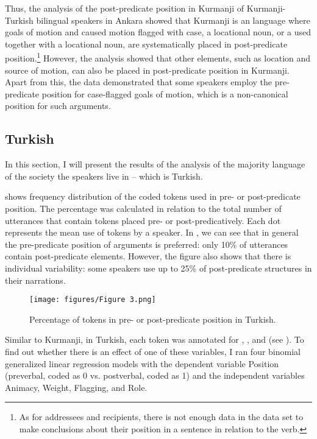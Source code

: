 \documentclass[output=paper,colorlinks,citecolor=brown]{langscibook}
\begin{document}
Thus, the analysis of the post-predicate position in Kurmanji of Kurmanji-Turkish bilingual speakers in Ankara showed that Kurmanji is an  language where goals of motion and caused motion flagged with case, a locational noun, or a  used together with a locational noun, are systematically placed in post-predicate position.\footnote{As for addressees and recipients, there is not enough data in the data set to make conclusions about their position in a sentence in relation to the verb.} However, the analysis showed that other elements, such as location and source of motion, can also be placed in post-predicate position in Kurmanji. Apart from this, the data demonstrated that some speakers employ the pre-predicate position for case-flagged goals of motion, which is a non-canonical position for such arguments. 

\subsection{Turkish}\label{Bilingual:ss:6.2}

In this section, I will present the results of the analysis of the majority language of the society the speakers live in – which is Turkish. 

 shows frequency distribution of the coded tokens used in pre- or post-predicate position. The percentage was calculated in relation to the total number of utterances that contain tokens placed pre- or post-predicatively. Each dot represents the mean use of tokens by a speaker. In , we can see that in general the pre-predicate position of arguments is preferred: only 10\% of utterances contain post-predicate elements. However, the figure also shows that there is individual variability: some speakers use up to 25\% of post-predicate structures in their narrations.

\begin{figure}
    \texttt{[image: figures/Figure 3.png]}
    \caption{Percentage of tokens in pre- or post-predicate position in Turkish.}
    \label{Bilingual:fig:3}
\end{figure}


Similar to Kurmanji, in Turkish, each token was annotated for , ,  and  (see ). To find out whether there is an effect of one of these variables, I ran four binomial generalized linear regression models with the dependent variable Position (preverbal, coded as 0 vs. postverbal, coded as 1) and the independent variables Animacy, Weight, Flagging, and Role.
\end{document}
